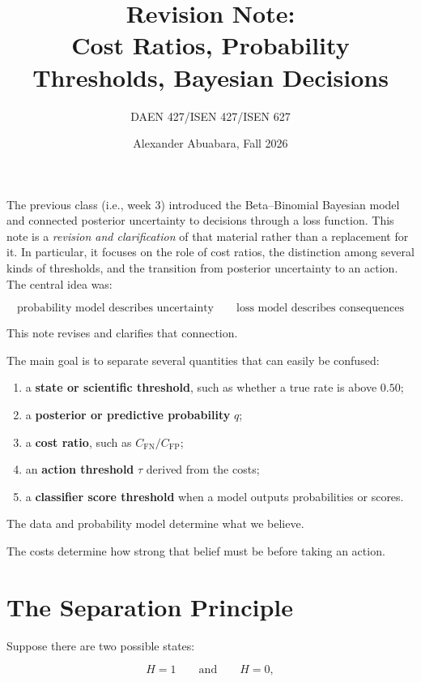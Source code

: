 \documentclass[11pt]{article}
\title{Revision Note:\\Cost Ratios, Probability Thresholds, Bayesian Decisions}
\author{DAEN 427/ISEN 427/ISEN 627}
\date{Alexander Abuabara, Fall 2026}
\newcommand{\CFP}{C_{\mathrm{FP}}}
\newcommand{\CFN}{C_{\mathrm{FN}}}
\begin{document}
\maketitle


The previous class (i.e., week 3) introduced the Beta--Binomial Bayesian model and connected posterior uncertainty to decisions through a loss function. This note is a \emph{revision and clarification} of that material rather than a replacement for it. In particular, it focuses on the role of cost ratios, the distinction among several kinds of thresholds, and the transition from posterior uncertainty to an action. The central idea was:

\[
\boxed{
\text{probability model describes uncertainty}
\qquad
\text{loss model describes consequences}
}
\]

This note revises and clarifies that connection.

The main goal is to separate several quantities that can easily be confused:

\begin{enumerate}[label=\arabic*.]
    \item a \textbf{state or scientific threshold}, such as whether a true rate is above $0.50$;
    \item a \textbf{posterior or predictive probability} $q$;
    \item a \textbf{cost ratio}, such as $\CFN/\CFP$;
    \item an \textbf{action threshold} $\tau$ derived from the costs;
    \item a \textbf{classifier score threshold} when a model outputs probabilities or scores.
\end{enumerate}

The data and probability model determine what we believe.

The costs determine how strong that belief must be before taking an action.

\section{The Separation Principle}

Suppose there are two possible states:

\[
H=1
\qquad\text{and}\qquad
H=0,
\]
\end{document}
